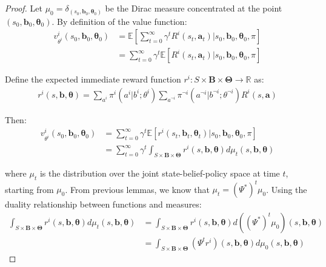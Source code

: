 \documentclass[a4paper,12pt]{report}
\begin{document}
\begin{proof}
    Let $\mu_{0} = \delta_{(s_0, \boldsymbol{b}_0, \boldsymbol{\theta}_0)}$ be the
    Dirac measure concentrated at the point $(s_{0}, \boldsymbol{b}_{0}, \boldsymbol
        {\theta}_{0})$. By definition of the value function:
    \begin{align}
        v^{i}_{\theta^i}(s_{0}, \boldsymbol{b}_{0}, \boldsymbol{\theta}_{0}) & = \mathbb{E}\left[ \sum_{t=0}^{\infty}\gamma^{t} R^{i}(s_{t}, \boldsymbol{a}_{t}) \bigg| s_{0}, \boldsymbol{b}_{0}, \boldsymbol{\theta}_{0}, \pi \right] \\
                                                                             & = \sum_{t=0}^{\infty}\gamma^{t} \mathbb{E}\left[ R^{i}(s_{t}, \boldsymbol{a}_{t}) \bigg| s_{0}, \boldsymbol{b}_{0}, \boldsymbol{\theta}_{0}, \pi \right]
    \end{align}

    Define the expected immediate reward function
    $r^{i}: S \times \boldsymbol{B}\times \boldsymbol{\Theta}\to \mathbb{R}$ as:
    \begin{align}
        r^{i}(s, \boldsymbol{b}, \boldsymbol{\theta}) = \sum_{a^i}\pi^{i}(a^{i}|b^{i}; \theta^{i}) \sum_{a^{\neg i}}\pi^{\neg i}(a^{\neg i}|b^{\neg i}; \theta^{\neg i}) R^{i}(s, \boldsymbol{a})
    \end{align}

    Then:
    \begin{align}
        v^{i}_{\theta^i}(s_{0}, \boldsymbol{b}_{0}, \boldsymbol{\theta}_{0}) & = \sum_{t=0}^{\infty}\gamma^{t} \mathbb{E}\left[ r^{i}(s_{t}, \boldsymbol{b}_{t}, \boldsymbol{\theta}_{t}) \bigg| s_{0}, \boldsymbol{b}_{0}, \boldsymbol{\theta}_{0}, \pi \right]       \\
                                                                             & = \sum_{t=0}^{\infty}\gamma^{t} \int_{S \times \boldsymbol{B} \times \boldsymbol{\Theta}}r^{i}(s, \boldsymbol{b}, \boldsymbol{\theta}) d\mu_{t}(s, \boldsymbol{b}, \boldsymbol{\theta})
    \end{align}

    where $\mu_{t}$ is the distribution over the joint state-belief-policy space
    at time $t$, starting from $\mu_{0}$. From previous lemmas, we know that $\mu_{t}
        = (\Psi^{*})^{t} \mu_{0}$. Using the duality relationship between functions
    and measures:
    \begin{align}
        \int_{S \times \boldsymbol{B} \times \boldsymbol{\Theta}}r^{i}(s, \boldsymbol{b}, \boldsymbol{\theta}) d\mu_{t}(s, \boldsymbol{b}, \boldsymbol{\theta}) & = \int_{S \times \boldsymbol{B} \times \boldsymbol{\Theta}}r^{i}(s, \boldsymbol{b}, \boldsymbol{\theta}) d((\Psi^{*})^{t}\mu_{0})(s, \boldsymbol{b}, \boldsymbol{\theta}) \\
                                                                                                                                                                & = \int_{S \times \boldsymbol{B} \times \boldsymbol{\Theta}}(\Psi^{t} r^{i})(s, \boldsymbol{b}, \boldsymbol{\theta}) d\mu_{0}(s, \boldsymbol{b}, \boldsymbol{\theta})
    \end{align}


\end{proof}
\end{document}
